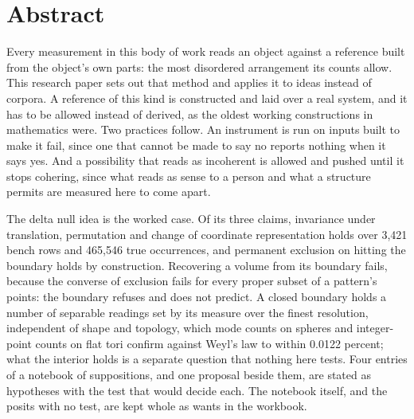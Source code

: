 \chapter*{Abstract}

Every measurement in this body of work reads an object against a reference built from the object's
own parts: the most disordered arrangement its counts allow. This research paper sets out that method
and applies it to ideas instead of corpora. A reference of this kind is constructed and laid over a
real system, and it has to be allowed instead of derived, as the oldest working constructions in
mathematics were. Two practices follow. An instrument is run on inputs built to make it fail, since one
that cannot be made to say no reports nothing when it says yes. And a possibility that reads as
incoherent is allowed and pushed until it stops cohering, since what reads as sense to a person and
what a structure permits are measured here to come apart.

The delta null idea is the worked case. Of its three claims, invariance under translation,
permutation and change of coordinate representation holds over 3{,}421 bench rows and 465{,}546 true
occurrences, and permanent exclusion on hitting the boundary holds by construction. Recovering a volume
from its boundary fails, because the converse of exclusion fails for every proper subset of a
pattern's points: the boundary refuses and does not predict. A closed boundary holds a number of
separable readings set by its measure over the finest resolution, independent of shape and topology,
which mode counts on spheres and integer-point counts on flat tori confirm against Weyl's law to within
0.0122 percent; what the interior holds is a separate question that nothing here tests. Four entries of
a notebook of suppositions, and one proposal beside them, are stated as hypotheses with the test that
would decide each. The notebook itself, and the posits with no test, are kept whole as wants in the
workbook.
\cleardoublepage
